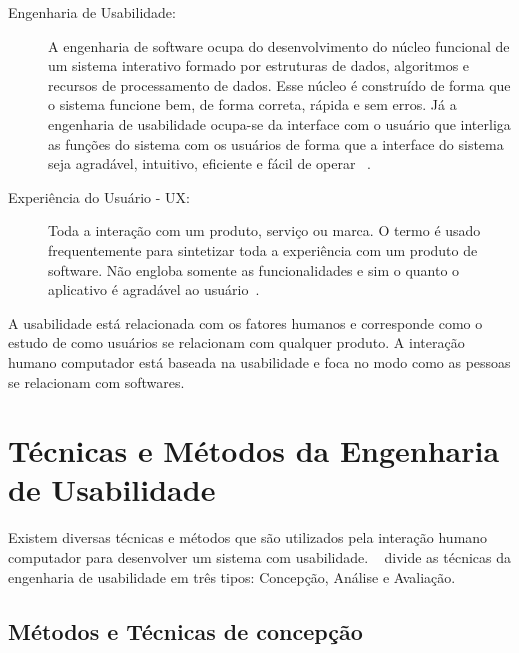 \begin{description}
\item[Engenharia de Usabilidade:]

A engenharia de software ocupa do desenvolvimento do núcleo funcional de um sistema interativo formado por estruturas de dados, algoritmos e recursos de processamento de dados. Esse núcleo é construído de forma que o sistema funcione bem, de forma correta, rápida e sem erros. Já a engenharia de usabilidade ocupa-se da interface com o usuário que interliga as funções do sistema com os usuários de forma que a interface do sistema seja agradável, intuitivo, eficiente e fácil de operar ~\cite{cybis2010}.
%


\item[Experiência do Usuário - UX: ]

Toda a interação com um produto, serviço ou marca. O termo é usado frequentemente para sintetizar toda a experiência com um produto de software. Não engloba  somente as funcionalidades e sim o quanto o aplicativo é agradável ao usuário~\cite{travis2013}.
%	


\end{description}

A usabilidade está relacionada com os fatores humanos e corresponde como o estudo de como usuários se relacionam com qualquer produto. A interação humano computador está baseada na usabilidade e foca no modo como as pessoas se relacionam com softwares.


\section{Técnicas e Métodos da Engenharia de Usabilidade}


Existem diversas técnicas e métodos que são utilizados pela interação humano computador para desenvolver um sistema com usabilidade. ~ divide as técnicas da engenharia de usabilidade em três tipos: Concepção, Análise e Avaliação.

\subsection{Métodos e Técnicas de concepção}

